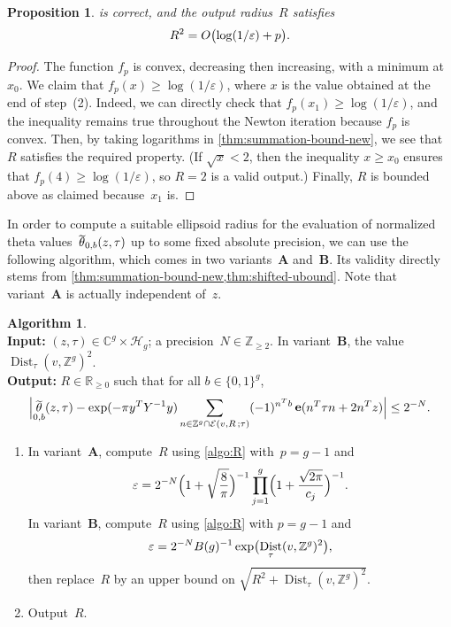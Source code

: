 \documentclass[12pt,oneside]{amsart}
\numberwithin{equation}{section}
\newtheorem{prop}[equation]{Proposition}
\theoremstyle{definition}
\newtheorem{algorithm}[equation]{Algorithm}
\newcommand{\algoinput}[1]{~\\ \noindent\textbf{Input:} #1}
\newcommand{\algooutput}[1]{~\\ \noindent\textbf{Output:} #1}
\newcommand{\Z}{\mathbb{Z}}
\newcommand{\R}{\mathbb{R}}
\newcommand{\C}{\mathbb{C}}
\newcommand{\Half}{\mathcal{H}}
\newcommand{\eps}{\varepsilon}
\newcommand{\eld}[3]{\ensuremath{\mathcal{E}(#1, #2\,; #3)}}
\DeclareMathOperator{\Dist}{Dist}
\DeclareMathOperator{\thetatilde}{\rlap{\raisebox{-0.1ex}{$\widetilde{\phantom{\,t}}$}}\theta}
\DeclareMathOperator{\e}{\mathbf{e}}
\DeclarePairedDelimiter{\abs}{|}{|}
\DeclarePairedDelimiter{\paren}{(}{)}
\begin{document}
\begin{prop}
  \label{prop:algo-R-correct}
   is correct, and the output radius~$R$ satisfies
  \begin{displaymath}
    R^2 = O\paren[\big]{\log(1/\eps) + p}.
  \end{displaymath}
\end{prop}

\begin{proof}
  The function $f_p$ is convex, decreasing then increasing, with a minimum at
  $x_0$. We claim that $f_p(x)\geq \log(1/\eps)$, where $x$ is the value
  obtained at the end of step~(2). Indeed, we can directly check that
  $f_p(x_1)\geq \log(1/\eps)$, and the inequality remains true throughout the
  Newton iteration because $f_p$ is convex. Then, by taking logarithms in
  \cref{thm:summation-bound-new}, we see that~$R$ satisfies the required
  property. (If $\sqrt{x} < 2$, then the inequality $x \geq x_0$ ensures that
  $f_p(4) \geq \log(1/\eps)$, so $R=2$ is a valid output.) Finally, $R$ is
  bounded above as claimed because~$x_1$ is.
\end{proof}

In order to compute a suitable ellipsoid radius for the evaluation of
normalized theta values~$\thetatilde_{0,b}(z,\tau)$ up to some fixed absolute
precision, we can use the following algorithm, which comes in two
variants~\textbf{A} and~\textbf{B}. Its validity directly stems from
\cref{thm:summation-bound-new,thm:shifted-ubound}. Note that variant~\textbf{A}
is actually independent of~$z$.

\begin{algorithm}
  \label{algo:compute-R}
  \algoinput{$(z,\tau)\in \C^g\times \Half_g$; a precision~$N\in \Z_{\geq
      2}$. In variant~\textbf{B}, the value $\Dist_\tau(v,\Z^g)^2$.}
  \algooutput{$R\in \R_{\geq 0}$ such that for all $b\in \{0,1\}^g$,
    \begin{displaymath}
      \abs[\Big]{\thetatilde_{0,b}(z,\tau) - \exp(-\pi y^TY^{-1}y) \sum_{n\in \Z^g\cap \eld{v}{R}{\tau}} (-1)^{n^T b} \e(n^T\tau n + 2n^T z)} \leq 2^{-N}.
    \end{displaymath}}
  \begin{enumerate}
  \item In variant~\textbf{A}, compute~$R$ using \cref{algo:R} with~$p = g-1$
    and
    \begin{displaymath}
      \eps = 2^{-N} \paren[\Big]{1 + \sqrt{\frac{8}{\pi}}}^{-1} \prod_{j=1}^g \paren[\Big]{1+\frac{\sqrt{2\pi}}{c_j}}^{-1}.
    \end{displaymath}
    In variant~\textbf{B}, compute~$R$ using \cref{algo:R} with $p=g-1$ and
    \begin{displaymath}
      \eps = 2^{-N} B(g)^{-1} \exp\paren[\big]{\Dist_\tau(v,\Z^g)^2},
    \end{displaymath}
    then replace~$R$ by an upper bound on $\sqrt{R^2 + \Dist_\tau(v, \Z^g)^2}$.
  \item Output~$R$.
  \end{enumerate}
\end{algorithm}
\end{document}
